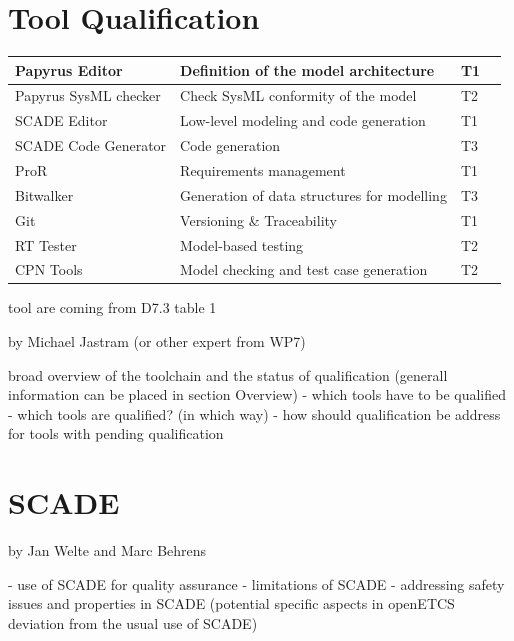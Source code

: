 \documentclass{template/openetcs_report}
\begin{document}
\section{Tool Qualification}

\begin{center}
\label{tab:ToolCat}
\tablelasttail{\hline}

\begin{supertabular}[H]{|p{2cm}|p{4cm}|p{4cm}|p{4cm}|}
\hline Papyrus Editor & Definition of the model architecture & T1 & \\
\hline Papyrus SysML checker & Check SysML conformity of the model & T2 & \\
\hline SCADE Editor & Low-level modeling and code generation & T1 & \\
\hline SCADE Code Generator & Code generation & T3 & \\
\hline ProR & Requirements management & T1 & \\
\hline Bitwalker & Generation of data structures for modelling & T3 & \\
\hline Git & Versioning \& Traceability & T1 & \\
\hline RT Tester & Model-based testing & T2 & \\ 
\hline CPN Tools & Model checking and test case generation & T2 & \\
\end{supertabular} 
\end{center}

tool are coming from D7.3 table 1

by Michael Jastram (or other expert from WP7)


broad overview of the toolchain and the status of qualification (generall information can be placed in section Overview)
- which tools have to be qualified
- which tools are qualified? (in which way)
- how should qualification be address for tools with pending qualification

\section{SCADE}

by Jan Welte and Marc Behrens

- use of SCADE for quality assurance
- limitations of SCADE
- addressing safety issues and properties in SCADE 
(potential specific aspects in openETCS deviation from the usual use of SCADE)
\end{document}
